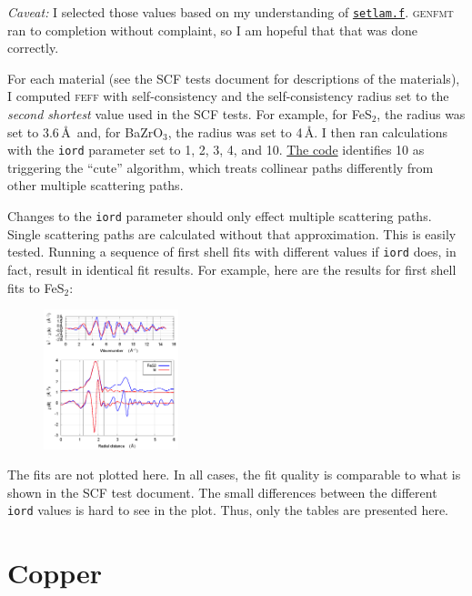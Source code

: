 \documentclass{article}
\begin{document}
\textit{Caveat:} I selected those values based on my understanding of
\href{https://github.com/xraypy/feff85exafs/blob/master/src/GENFMT/setlam.f}%
{\texttt{setlam.f}}.  \textsc{genfmt} ran to completion without
complaint, so I am hopeful that that was done correctly.

For each material (see the SCF tests document for descriptions of the
materials), I computed \textsc{feff} with self-consistency and the
self-consistency radius set to the \textit{second shortest} value used
in the SCF tests.  For example, for FeS$_2$, the radius was set to
3.6\,\AA\ and, for BaZrO$_3$, the radius was set to 4\,\AA.  I then
ran calculations with the \texttt{iord} parameter set to 1, 2, 3, 4,
and 10.
\href{https://github.com/xraypy/feff85exafs/blob/master/src/GENFMT/setlam.f#L60}%
{The code} identifies 10 as triggering the ``cute'' algorithm, which
treats collinear paths differently from other multiple scattering
paths.

Changes to the \texttt{iord} parameter should only effect multiple
scattering paths.  Single scattering paths are calculated without that
approximation.  This is easily tested.  Running a sequence of first
shell fits with different values if \texttt{iord} does, in fact,
result in identical fit results.  For example, here are the results
for first shell fits to FeS$_2$:

{
\begin{figure}
  \vspace{-40pt}
  \includegraphics[width=0.35\textwidth]{FeS2/iorder/fit_iorder_02_1st.png}
\end{figure}
\small

}
\clearpage
\normalsize
The fits are not plotted here.  In all cases, the fit quality is
comparable to what is shown in the SCF test document.  The small
differences between the different \texttt{iord} values is hard to see
in the plot.  Thus, only the tables are presented here.

\section{Copper}
\end{document}
